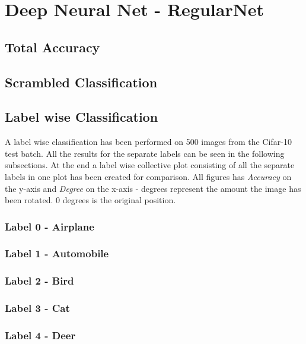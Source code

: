 \section{Deep Neural Net - RegularNet}
\subsection{Total Accuracy}
\subsection{Scrambled Classification}



\subsection{Label wise Classification}
A label wise classification has been performed on 500 images from the Cifar-10 test batch. All the results for the separate labels can be seen in the following subsections. At the end a label wise collective plot consisting of all the separate labels in one plot has been created for comparison.
All figures has \emph{Accuracy} on the y-axis and \emph{Degree} on the x-axis - degrees represent the amount the image has been rotated. 0 degrees is the original position.
\subsubsection{Label 0 - Airplane}
\FloatBarrier
\subsubsection{Label 1 - Automobile}
\FloatBarrier
\subsubsection{Label 2 - Bird}
\FloatBarrier
\subsubsection{Label 3 - Cat}
\FloatBarrier
\subsubsection{Label 4 - Deer}
\FloatBarrier
